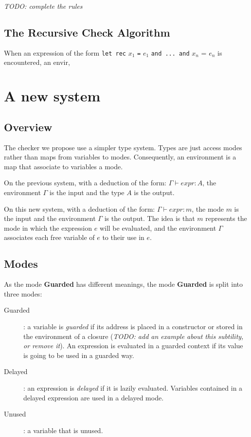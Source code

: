 \documentclass{article}
\begin{document}
\textit{TODO: complete the rules}

\subsection{The Recursive Check Algorithm}

When an expression of the form
\verb"let rec" $x_1$ \verb"=" $e_1$ \verb"and ... and" $x_n$ = $e_n$
is encountered, an envir,

\section{A new system}

\subsection{Overview}
The checker we propose use a simpler type system. Types are just access modes
rather than maps from variables to modes. Consequently, an environment is a map
that associate to variables a mode.

On the previous system, with a deduction of the form: $\Gamma \vdash expr: A$,
the environment $\Gamma$ is the input and the type $A$ is the output.

On this new system, with a deduction of the form: $\Gamma \vdash expr: m$, the
mode $m$ is the input and the environment $\Gamma$ is the output. The idea is
that $m$ represents the mode in which the expression $e$ will be evaluated, and
the environment $\Gamma$ associates each free variable of $e$ to their use in
$e$.

\subsection{Modes}

As the mode \textbf{Guarded} has different meanings, the mode \textbf{Guarded}
is split into three modes:

\begin{description}
  \item[Guarded]: a variable is \textit{guarded} if its address is placed in a
    constructor or stored in the environment of a closure (\textit{TODO: add an
    example about this subtility, or remove it}). An expression is evaluated in     a guarded context if its value is going to be used in a guarded way.
  \item[Delayed]: an expression is \textit{delayed} if it is lazily evaluated.
    Variables contained in a delayed expression are used in a delayed mode.
  \item[Unused]: a variable that is unused.
\end{description}
\end{document}
